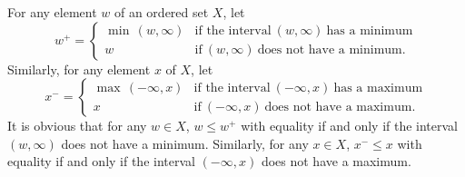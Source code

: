 \documentclass{article}
\begin{document}
For any element \(w\) of an ordered set \(X\), let
\begin{displaymath}
  w^+ =
  \begin{cases}
    \min \, (w, \infty)
    & \text{if the interval} ~ (w, \infty) ~
      \text{has a minimum} \\
    w
    & \text{if} ~ (w, \infty) ~
      \text{does not have a minimum}.
  \end{cases}
\end{displaymath}
Similarly, for any element \(x\) of \(X\), let
\begin{displaymath}
  x^- =
  \begin{cases}
    \max \, (-\infty, x)
    & \text{if the interval} ~ (-\infty, x) ~
      \text{has a maximum} \\
    x
    & \text{if} ~ (-\infty, x) ~
      \text{does not have a maximum}.
  \end{cases}
\end{displaymath}
It is obvious that for any \(w \in X\), \(w \leq w^+\) with equality
if and only if the interval \((w, \infty)\) does not have a minimum.
Similarly, for any \(x \in X\), \(x^- \leq x\) with equality if and
only if the interval \((-\infty, x)\) does not have a maximum.
\end{document}
